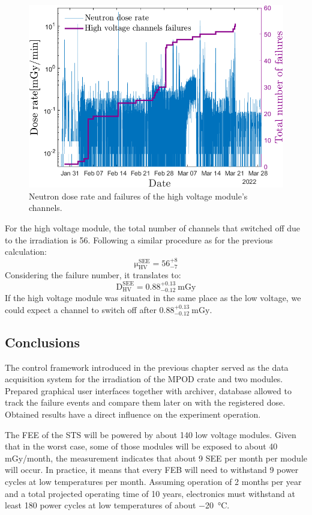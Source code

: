 \begin{figure}[!h]
    \centering
    \includegraphics[width=0.6\columnwidth]{Chapter4/images/Hv_neutrons_dose_rate.png}
    \caption{Neutron dose rate and failures of the high voltage module's channels.}
    \label{fig:hv_neutrons_rate}
\end{figure}
For the high voltage module, the total number of channels that switched off due to the irradiation is 56. Following a similar procedure as for the previous calculation:
  \begin{equation}
 \mathrm{\mu}_{\mathrm{HV}}^{\mathrm{SEE}}=\mathrm{56}_{-7}^{+8}
\end{equation}
Considering the failure number, it translates to:
\begin{equation}
    \mathrm{D}_{\mathrm{HV}}^{\mathrm{SEE}}=\mathrm{0.88}_{-0.12}^{+0.13}\mathrm{\ mGy}
\end{equation}
If the high voltage module was situated in the same place as the low voltage, we could expect a channel to switch off after $\mathrm{0.88}_{-0.12}^{+0.13}\mathrm{\ mGy}$.
\newpage
\subsection{Conclusions}

\label{irradiation_results}
The control framework introduced in the previous chapter served as the data acquisition system for the irradiation of the MPOD crate and two modules. Prepared graphical user interfaces together with archiver, database allowed to track the failure events and compare them later on with the registered dose. Obtained results have a direct influence on the experiment operation.

The \gls{FEE} of the \gls{STS} will be powered by about 140 low voltage modules. Given that in the worst case, some of those modules will be exposed to about 40 mGy/month, the measurement indicates that about 9 \gls{SEE} per month per module will occur. In practice, it means that every FEB will need to withstand 9 power cycles at low temperatures per month. Assuming operation of 2 months per year and a total projected operating time of 10 years, electronics must withstand at least 180 power cycles at low temperatures of about \SI{-20}{\celsius}.
